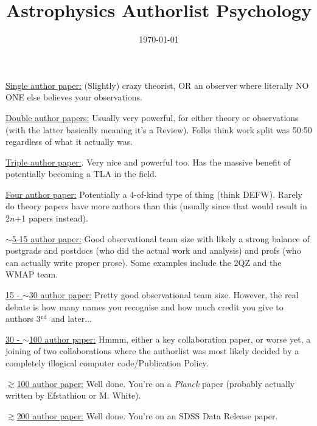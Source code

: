 \documentclass[11pt]{article}
\begin{document}
\title{Astrophysics Authorlist Psychology}
\date{\today}
\maketitle



\medskip
\medskip
\noindent
\underline{Single author paper:} (Slightly) crazy theorist, OR an observer where literally NO ONE else believes your observations. 


\medskip
\medskip
\noindent
\underline{Double author papers:} Usually very powerful, for either theory or observations (with the latter basically meaning it's a Review). Folks think work split was 50:50 regardless of what it actually was. 

\medskip
\medskip
\noindent
\underline{Triple author paper:}. Very nice and powerful too. Has the massive benefit of potentially becoming a TLA in the field. 

\medskip
\medskip
\noindent
\underline{Four author paper:} Potentially a 4-of-kind type of  thing (think DEFW). Rarely do theory papers have more authors than this (usually since that would result in 2$n$+1 papers instead). 


\medskip
\medskip
\noindent
\underline{$\sim$5-15 author paper:} Good observational team size with likely a strong balance of postgrads and postdocs (who did the actual work and analysis) and profs (who can actually write proper prose). Some examples include the 2QZ and the WMAP team. 


\medskip
\medskip
\noindent
\underline{15 - $\sim$30 author paper:} Pretty good observational team size. However, the real debate is how many names you recognise and how much credit you give to authors 3$^{\rm rd}$ and later...

\medskip
\medskip
\noindent
\underline{30 - $\sim$100 author paper:} Hmmm, either a key collaboration paper, or worse yet, a joining of two collaborations where the authorlist was most likely decided by a completely illogical computer code/Publication Policy. 


\medskip
\medskip
\noindent
\underline{$\gtrsim$100 author paper:} Well done. You're on a {\it Planck} paper (probably actually written by Efstathiou or M. White). 


\medskip
\medskip
\noindent
\underline{$\gtrsim$200 author paper:} Well done. You're on an SDSS Data Release paper. 
\end{document}
